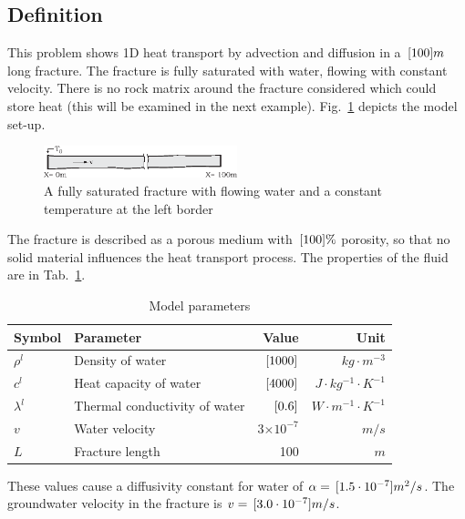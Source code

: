 \subsection{Definition}

This problem shows 1D heat transport by advection and diffusion in a $\, \mathrm{[}100]{m}$ long fracture. The fracture is fully saturated with water, flowing with constant velocity. There is no rock matrix around the fracture considered which could store heat (this will be examined in the next example). Fig.~\ref{fig-addiff1} depicts the model set-up.
%
\begin{figure}[h]
\centering
\includegraphics[width=0.5\textwidth]{PART_II/T/Ad-Diff-Problem-def.eps}
\caption{\label{fig-addiff1}A fully saturated fracture with flowing water and a constant temperature at the left border}
\end{figure}

The fracture is described as a porous medium with $\, \mathrm{[}100]{\%}$ porosity, so that no solid material influences the heat transport process. The properties of the fluid are in Tab.~\ref{tab-addiff}.

\begin{table}[htbp!]
\caption{\label{tab-addiff}Model parameters}
\begin{center}
\begin{tabular}{llrr}
\toprule
Symbol & Parameter & Value & Unit \\
\midrule
$\rho^l$ & Density of water & $\, \mathrm{[}1000]{}$ & ${kg \cdot m^{-3}}$ \\			
$c^l$	& Heat capacity of water & $\, \mathrm{[}4000]{}$ & ${J \cdot kg^{-1} \cdot K^{-1}}$ \\
$\lambda^l$ & Thermal conductivity of water	& $\, \mathrm{[}0.6]{}$ & ${W \cdot m^{-1} \cdot K^{-1}}$ \\
$v$ & Water velocity & 3$\times 10^{-7}$ & $m/s$ \\
$L$ & Fracture length & 100 & $m$ \\
\bottomrule
\end{tabular}
\end{center}
\end{table}

These values cause a diffusivity constant for water of $\alpha=\, \mathrm{[}1.5 \cdot 10^{-7}]{m^2/s}$. The groundwater velocity in the fracture is $v=\, \mathrm{[}3.0 \cdot 10^{-7}]{m/s}$.

